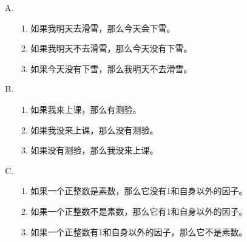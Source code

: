 {{        %
        \begin{practices}
            \begin{enumerate}[A.]
                \item
                {
                    \begin{enumerate}[1)]
                        \item 如果我明天去滑雪，那么今天会下雪。
                        \item 如果我明天不去滑雪，那么今天没有下雪。
                        \item 如果今天没有下雪，那么我明天不去滑雪。
                    \end{enumerate}
                }
                \item
                {
                    \begin{enumerate}[1)]
                        \item 如果我来上课，那么有测验。
                        \item 如果我没来上课，那么没有测验。
                        \item 如果没有测验，那么我没来上课。
                    \end{enumerate}
                }
                \item
                {
                    \begin{enumerate}[1)]
                        \item 如果一个正整数是素数，那么它没有1和自身以外的因子。
                        \item 如果一个正整数不是素数，那么它有1和自身以外的因子。
                        \item 如果一个正整数有1和自身以外的因子，那么它不是素数。
                    \end{enumerate}
                }
            \end{enumerate}
        \end{practices}

}}
